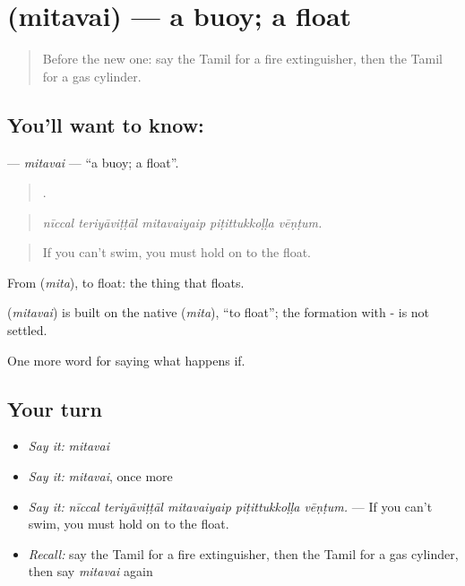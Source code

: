 \section[\texorpdfstring{\ta{மிதவை} (mitavai)}{மிதவை (mitavai)}]{ (mitavai) — a buoy; a float}

\label{lesson:TA-C552-mitavai}



\begin{quote}
Before the new one: say the Tamil for a fire extinguisher, then the Tamil for a gas cylinder.
\end{quote}

\subsection*{You'll want to know: }
\textbf{} — \emph{mitavai} — \textquotedblleft{}a buoy; a float\textquotedblright{}.

\begin{quote}
    .
\end{quote}

\begin{quote}
\emph{nīccal teriyāviṭṭāl mitavaiyaip piṭittukkoḷḷa vēṇṭum.}
\end{quote}

\begin{quote}
If you can't swim, you must hold on to the float.
\end{quote}

From  (\emph{mita}), to float: the thing that floats.

\begin{cousinweb}
\textbf{} (\emph{mitavai}) is built on the native  (\emph{mita}), \textquotedblleft{}to float\textquotedblright{}; the formation with - is not settled.
\end{cousinweb}

\begin{grammarlens}[title={What you've built}]
One more word for saying what happens if.
\end{grammarlens}

\subsection*{Your turn}
\begin{itemize}
\raggedright
  \item \emph{Say it:} \emph{mitavai}
  \item \emph{Say it:} \emph{mitavai}, once more
  \item \emph{Say it:} \emph{nīccal teriyāviṭṭāl mitavaiyaip piṭittukkoḷḷa vēṇṭum.} — If you can't swim, you must hold on to the float.
  \item \emph{Recall:} say the Tamil for a fire extinguisher, then the Tamil for a gas cylinder, then say \emph{mitavai} again
\end{itemize}

